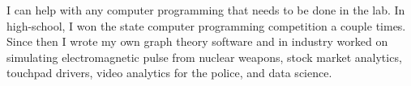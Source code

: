 \documentclass{article}
\begin{document}
I can help with any computer programming that needs to be done in the lab. In high-school, I won the state computer programming competition a couple times. Since then I wrote my own graph theory software and in industry worked on simulating electromagnetic pulse from nuclear weapons, stock market analytics, touchpad drivers, video analytics for the police, and data science. 
\end{document}
